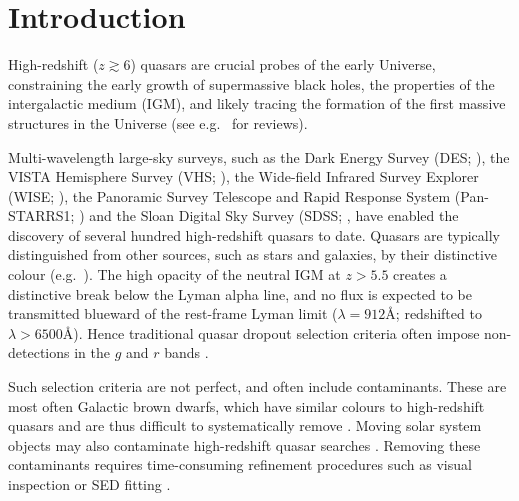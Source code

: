 \documentclass[fleqn,usenatbib]{mnras}
\begin{document}
\section{Introduction
\label{intro}}


High-redshift ($z\gtrsim6$) quasars are crucial probes of the early Universe, constraining the early growth of supermassive black holes, the properties of the intergalactic medium (IGM), and likely tracing the formation of the first massive structures in the Universe (see e.g.\ \citealt{inayoshi20, volonteri21, fan23} for reviews).

Multi-wavelength large-sky surveys, such as the Dark Energy Survey (DES; \citealt{des}), the VISTA Hemisphere Survey (VHS; \citealt{vhs}), the Wide-field Infrared Survey Explorer (WISE; \citealt{wise}), the Panoramic Survey Telescope and Rapid Response System (Pan-STARRS1; \citealt{panstarrs}) and the Sloan Digital Sky Survey (SDSS; \citealt{sdss}, have enabled the discovery of several hundred high-redshift quasars to date.
Quasars are typically distinguished from other sources, such as stars and galaxies, by their distinctive colour (e.g.\ \citealt{venemans13, banados15, reed15, reed17}).
The high opacity of the neutral IGM at $z>5.5$ creates a distinctive break below the Lyman alpha line, and no flux is expected to be transmitted blueward of the rest-frame Lyman limit ($\lambda=912$\AA; redshifted to $\lambda>6500$\AA).
Hence traditional quasar dropout selection criteria often impose non-detections in the $g$ and $r$ bands \citep{fan01, richards02, reed15, jiang16, Banados2016, reed17, wang19, banados23}.

Such selection criteria are not perfect, and often include contaminants. 
These are most often Galactic brown dwarfs, which have similar colours to high-redshift quasars and are thus difficult to systematically remove \citep{wang19, yang22}.
Moving solar system objects may also contaminate high-redshift quasar searches \citep{bosman23}.
Removing these contaminants requires time-consuming refinement procedures such as visual inspection \citep{venemans13, banados15, reed15} or SED fitting \citep{reed17, andika23}.
\end{document}
